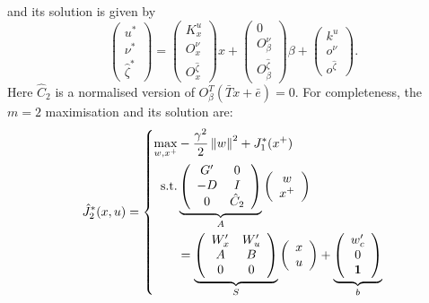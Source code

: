 \documentclass{ifacconf}
\providecommand{\norm}[1]{\left\|#1\right\|}
\begin{document}
and its solution is given by
\begin{equation}
	\left(\begin{array}{c}
	u^\ast \\
	\nu^\ast \\
	\hat\zeta^\ast
	\end{array}\right) = \left(\begin{array}{c}K^u_x\\ O^{\nu}_x \\ O^{\hat\zeta}_x
	\end{array}\right)x + 
	\left(\begin{array}{c}0\\ O^{\nu}_\beta \\ O^{\hat\zeta}_{\beta}
	\end{array}\right)\beta + \left(\begin{array}{c}k^u\\ o^{\nu} \\ o^{\hat\zeta}
	\end{array}\right).
\end{equation}
Here $\hat C_2$ is a normalised version of $O^T_\beta(\bar T x + \bar e) = 0$.
For completeness, the $m=2$ maximisation and its solution are:
\begin{equation}
	\hat J_2^\ast(x,u) = \left\{\begin{split}
	\max_{w,x^+} & -\frac{\gamma^2}{2}\norm{w}^2 + J_{1}^\ast(x^+)\\
	\text{s.t.} & 
	\underbrace{\left(\begin{array}{cc}
	G^\prime & 0 \\ -D & I \\
	0 & \hat C_2
	\end{array}\right)}_{\bar A}
	\left(\begin{array}{c}w\\ x^+\end{array}\right)
	\\&= \underbrace{\left(\begin{array}{cc}W_x^\prime & W_u^\prime \\ A & B \\ 0 & 0\end{array}\right)}_{
	\bar S
	}
	\left(\begin{array}{c}x \\ u \end{array}\right) + \underbrace{\left(\begin{array}{c}
	w_c^\prime \\ 0 \\ {\bf{1}}\end{array}\right)}_{\bar b}
	\end{split}\right.
\end{equation}
\end{document}
